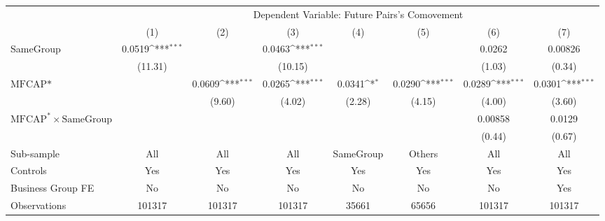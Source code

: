 {
\def\sym#1{\ifmmode^{#1}\else\(^{#1}\)\fi}
\begin{tabular}{l*{7}{c}}
\hline\hline
                &\multicolumn{7}{c}{Dependent Variable:  Future Pairs's Comovement}                                                                  \\\cmidrule(lr){2-8}
                &\multicolumn{1}{c}{(1)}         &\multicolumn{1}{c}{(2)}         &\multicolumn{1}{c}{(3)}         &\multicolumn{1}{c}{(4)}         &\multicolumn{1}{c}{(5)}         &\multicolumn{1}{c}{(6)}         &\multicolumn{1}{c}{(7)}         \\
\hline
SameGroup       &   0.0519\sym{***}&                  &   0.0463\sym{***}&                  &                  &   0.0262         &  0.00826         \\
                &  (11.31)         &                  &  (10.15)         &                  &                  &   (1.03)         &   (0.34)         \\
[1em]
$ \text{MFCAP*} $&                  &   0.0609\sym{***}&   0.0265\sym{***}&   0.0341\sym{*}  &   0.0290\sym{***}&   0.0289\sym{***}&   0.0301\sym{***}\\
                &                  &   (9.60)         &   (4.02)         &   (2.28)         &   (4.15)         &   (4.00)         &   (3.60)         \\
[1em]
 $ \text{MFCAP}^* \times {\text{SameGroup} }  $ &                  &                  &                  &                  &                  &  0.00858         &   0.0129         \\
                &                  &                  &                  &                  &                  &   (0.44)         &   (0.67)         \\
\hline
Sub-sample      &      All         &      All         &      All         &SameGroup         &   Others         &      All         &      All         \\
Controls        &      Yes         &      Yes         &      Yes         &      Yes         &      Yes         &      Yes         &      Yes         \\
Business Group FE&       No         &       No         &       No         &       No         &       No         &       No         &      Yes         \\
Observations    &   101317         &   101317         &   101317         &    35661         &    65656         &   101317         &   101317         \\
\hline\hline  \end{tabular}}
